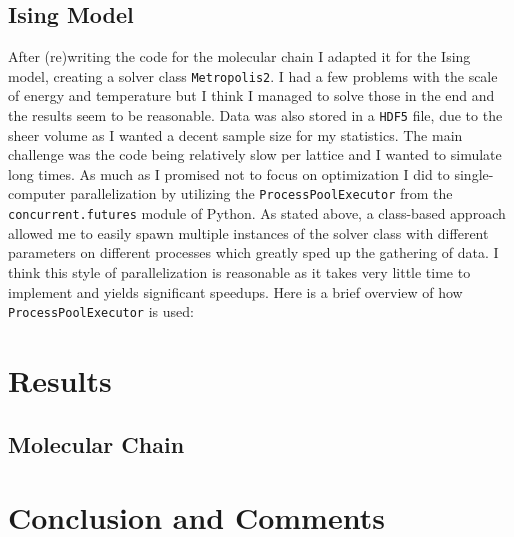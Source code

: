 \documentclass[10pt, titlepage, a4paper]{article}
\begin{document}
\subsection{Ising Model}
After (re)writing the code for the molecular chain I adapted it for the Ising model, creating a solver class \texttt{Metropolis2}. I had a few problems
with the scale of energy and temperature but I think I managed to solve those in the end and the results seem to be reasonable. Data was also stored in 
a \texttt{HDF5} file, due to the sheer volume as I wanted a decent sample size for my statistics. The main challenge was the code being relatively slow 
per lattice and I wanted to simulate long times. As much as I promised not to focus on optimization I did to single-computer parallelization by utilizing
the \texttt{ProcessPoolExecutor} from the \texttt{concurrent.futures} module of Python. As stated above, a class-based approach allowed me to easily
spawn multiple instances of the solver class with different parameters on different processes which greatly sped up the gathering of data. I think this 
style of parallelization is reasonable as it takes very little time to implement and yields significant speedups. Here is 
a brief overview of how \texttt{ProcessPoolExecutor} is used:



\section{Results}
\subsection{Molecular Chain}



\section{Conclusion and Comments}




\end{document}
